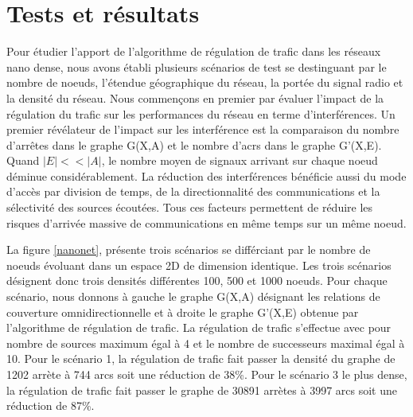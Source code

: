 \documentclass[sigconf]{acmart}
\begin{document}
\section{Tests et résultats}
Pour étudier l'apport de l'algorithme de régulation de trafic dans les réseaux nano dense, nous avons établi plusieurs scénarios de test se destinguant par le nombre de noeuds, l'étendue géographique du réseau, la portée du signal radio et la densité du réseau. Nous commençons en premier par évaluer l'impact de la régulation du trafic sur les performances du réseau en terme d'interférences. Un premier révélateur de l'impact sur les interférence est la comparaison du nombre d'arrêtes dans le graphe G(X,A) et le nombre d'acrs dans le graphe G'(X,E). Quand $|E|<<|A|$, le nombre moyen de signaux arrivant sur chaque noeud déminue considérablement. La réduction des interférences bénéficie aussi du mode d'accès par division de temps, de la directionnalité des communications et la sélectivité des sources écoutées. Tous ces facteurs permettent de réduire les risques d'arrivée massive de communications en même temps sur un même noeud. 

La figure \ref{nanonet}, présente trois scénarios se différciant par le nombre de noeuds évoluant dans un espace 2D de dimension identique. Les trois scénarios désignent donc trois densités différentes 100, 500 et 1000 noeuds. Pour chaque scénario, nous donnons à gauche le graphe G(X,A) désignant les relations de couverture omnidirectionnelle et à droite le graphe G'(X,E) obtenue par l'algorithme de régulation de trafic. La régulation de trafic s'effectue avec pour nombre de sources maximum égal à 4 et le nombre de successeurs maximal égal à 10. Pour le scénario 1, la régulation de trafic fait passer la densité du graphe de 1202 arrète à 744 arcs soit une réduction de 38\%. Pour le scénario 3 le plus dense, la régulation de trafic fait passer le graphe de 30891 arrètes à 3997 arcs soit une réduction de 87\%.  
\end{document}
